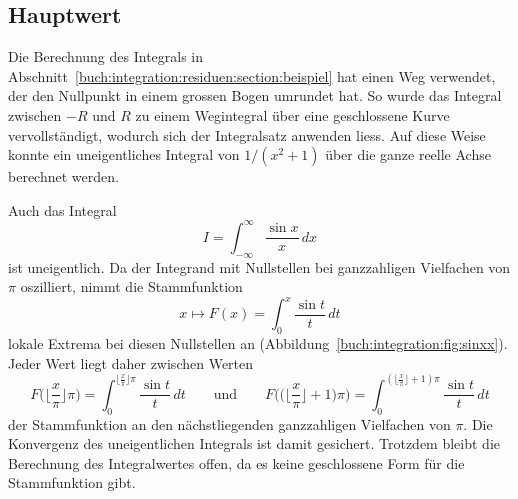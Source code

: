 %
%
%
\subsection{Hauptwert
\label{buch:integration:residuen:subsection:hauptwert}}
Die Berechnung des Integrals in
Abschnitt~\ref{buch:integration:residuen:section:beispiel}
hat einen Weg verwendet, der den Nullpunkt in einem grossen
Bogen umrundet hat.
So wurde das Integral zwischen $-R$ und $R$ zu einem Wegintegral
über eine geschlossene Kurve vervollständigt, wodurch sich der
Integralsatz anwenden liess.
Auf diese Weise konnte ein uneigentliches Integral von 
$1/(x^2+1)$ über die ganze reelle Achse berechnet werden.

Auch das Integral
%
\begin{equation}
I
=
\int_{-\infty}^\infty \frac{\sin x}{x}\,dx
\label{buch:integration:residuen:eqn:sinxxintegral}
\end{equation}
ist uneigentlich.
Da der Integrand mit Nullstellen bei ganzzahligen Vielfachen
von $\pi$ oszilliert, nimmt die Stammfunktion
\[
x
\mapsto
F(x)
=
\int_{0}^{x} \frac{\sin t}{t}\,dt
\]
lokale Extrema bei diesen Nullstellen an
(Abbildung~\ref{buch:integration:fig:sinxx}).
Jeder Wert liegt daher zwischen Werten
\[
F\biggl(
\biggl\lfloor\frac{x}{\pi}\biggr\rfloor\pi
\biggr)
=
\int_{0}^{\lfloor\frac{x}{\pi}\rfloor\pi}
\frac{\sin t}{t}\,dt
\qquad
\text{und}
\qquad
F\biggl(
\biggl(\biggl\lfloor\frac{x}{\pi}\biggr\rfloor+1\biggr)\pi
\biggr)
=
\int_{0}^{\left(\lfloor\frac{x}{\pi}\rfloor+1\right)\pi}
\frac{\sin t}{t}\,dt
\]
der Stammfunktion an den nächstliegenden ganzzahligen Vielfachen von $\pi$.
Die Konvergenz des uneigentlichen Integrals ist damit gesichert.
Trotzdem bleibt die Berechnung des Integralwertes offen, da es
keine geschlossene Form für die Stammfunktion gibt.


